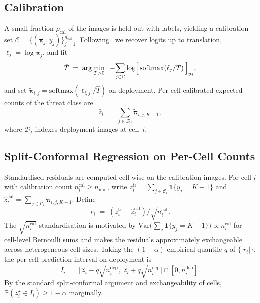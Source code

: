 \documentclass[conference]{IEEEtran}
\begin{document}
\subsection{Calibration}

A small fraction $\rho_{\mathrm{cal}}$ of the images is held out with
labels, yielding a calibration set
$\mathcal{C}=\{(\boldsymbol{\pi}_j,y_j)\}_{j=1}^{n_{\mathrm{cal}}}$.
Following~\cite{guo2017calibration,dussert2025confident} we recover
logits up to translation, $\ell_j=\log\boldsymbol{\pi}_j$, and fit
\begin{equation}
  \hat{T}\;=\;\arg\min_{T>0}\;\;-\!\sum_{j\in\mathcal{C}}
  \log\Bigl[\,\mathrm{softmax}(\ell_j/T)\,\Bigr]_{y_j},
  \label{eq:temperature}
\end{equation}
and set $\tilde{\boldsymbol{\pi}}_{i,j}=\mathrm{softmax}(\ell_{i,j}/\hat T)$
on deployment. Per-cell calibrated expected counts of the threat class
are
\begin{equation}
  \hat{z}_i \;=\; \sum_{j\in\mathcal{D}_i}\tilde{\boldsymbol{\pi}}_{i,j,K-1},
  \label{eq:zhat}
\end{equation}
where $\mathcal{D}_i$ indexes deployment images at cell~$i$.

\subsection{Split-Conformal Regression on Per-Cell Counts}

Standardised residuals are computed cell-wise on the calibration
images. For cell $i$ with calibration count
$n^{\mathrm{cal}}_i\ge n_{\min}$, write
$z^{\mathrm{tr}}_i=\sum_{j\in\mathcal{C}_i}\mathbf{1}\{y_j=K{-}1\}$
and $\hat{z}^{\mathrm{cal}}_i=\sum_{j\in\mathcal{C}_i}\tilde{\boldsymbol{\pi}}_{i,j,K-1}$.
Define
\begin{equation}
  r_i \;=\; (z^{\mathrm{tr}}_i - \hat{z}^{\mathrm{cal}}_i)/\sqrt{n^{\mathrm{cal}}_i}.
\end{equation}
The $\sqrt{n^{\mathrm{cal}}_i}$ standardisation is motivated by
$\mathrm{Var}\bigl(\sum_{j}\mathbf{1}\{y_j=K{-}1\}\bigr)\propto n^{\mathrm{cal}}_i$
for cell-level Bernoulli sums and makes the residuals approximately
exchangeable across heterogeneous cell sizes. Taking the $(1-\alpha)$
empirical quantile $q$ of $\{|r_i|\}$, the per-cell prediction interval
on deployment is
\begin{equation}
  I_i \;=\; \bigl[\,\hat{z}_i - q\sqrt{n^{\mathrm{dep}}_i},\;
                       \hat{z}_i + q\sqrt{n^{\mathrm{dep}}_i}\bigr]\cap[0,n^{\mathrm{dep}}_i].
  \label{eq:interval}
\end{equation}
By the standard split-conformal argument and exchangeability of cells,
$\mathbb{P}(z_i^{\star}\in I_i)\ge 1-\alpha$ marginally.
\end{document}
